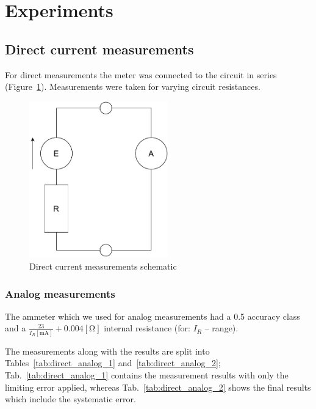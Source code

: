 \section{Experiments}

\subsection{Direct current measurements}

For direct measurements the meter was connected to the circuit in series (Figure~\ref{fig:direct_schematic}). Measurements were taken for varying circuit resistances.

\begin{figure}[H]
	\centering
	\includegraphics[width=6cm]{schematics/direct.pdf}
	\caption{Direct current measurements schematic}
	\label{fig:direct_schematic}
\end{figure}

\subsubsection{Analog measurements}

The ammeter which we used for analog measurements had a 0.5 accuracy class and a $\frac{23}{I_R  [\unit{\milli\ampere}]} + 0.004 [\unit{\ohm}]$ internal resistance (for: $I_R$ -- range).

The measurements along with the results are split into Tables~\ref{tab:direct_analog_1} and~\ref{tab:direct_analog_2}; Tab.~\ref{tab:direct_analog_1} contains the measurement results with only the limiting error applied, whereas Tab.~\ref{tab:direct_analog_2} shows the final results which include the systematic error.


